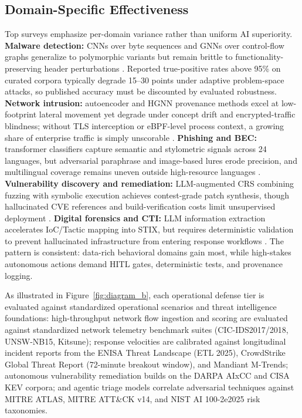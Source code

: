 \documentclass[conference,10pt,twocolumn,a4paper]{IEEEtran}
\begin{document}
\subsection{Domain-Specific Effectiveness}
Top surveys emphasize per-domain variance rather than uniform AI superiority. \textbf{Malware detection:} CNNs over byte sequences and GNNs over control-flow graphs generalize to polymorphic variants but remain brittle to functionality-preserving header perturbations \cite{carlini2017towards, mirsky2018kitsune}. Reported true-positive rates above 95\% on curated corpora typically degrade 15--30 points under adaptive problem-space attacks, so published accuracy must be discounted by evaluated robustness. \textbf{Network intrusion:} autoencoder and HGNN provenance methods excel at low-footprint lateral movement yet degrade under concept drift and encrypted-traffic blindness; without TLS interception or eBPF-level process context, a growing share of enterprise traffic is simply unscorable \cite{mirsky2018kitsune, jiang2024provenance}. \textbf{Phishing and BEC:} transformer classifiers capture semantic and stylometric signals across 24 languages, but adversarial paraphrase and image-based lures erode precision, and multilingual coverage remains uneven outside high-resource languages \cite{enisa_etl_2025}. \textbf{Vulnerability discovery and remediation:} LLM-augmented CRS combining fuzzing with symbolic execution achieves contest-grade patch synthesis, though hallucinated CVE references and build-verification costs limit unsupervised deployment \cite{darpa_aixcc_2025, fang2024llm, fang2024teams}. \textbf{Digital forensics and CTI:} LLM information extraction accelerates IoC/Tactic mapping into STIX, but requires deterministic validation to prevent hallucinated infrastructure from entering response workflows \cite{cisa_agentic_ai_2026}. The pattern is consistent: data-rich behavioral domains gain most, while high-stakes autonomous actions demand HITL gates, deterministic tests, and provenance logging.

As illustrated in Figure~\ref{fig:diagram_b}, each operational defense tier is evaluated against standardized operational scenarios and threat intelligence foundations: high-throughput network flow ingestion and scoring are evaluated against standardized network telemetry benchmark suites (CIC-IDS2017/2018, UNSW-NB15, Kitsune); response velocities are calibrated against longitudinal incident reports from the ENISA Threat Landscape (ETL 2025), CrowdStrike Global Threat Report (72-minute breakout window), and Mandiant M-Trends; autonomous vulnerability remediation builds on the DARPA AIxCC and CISA KEV corpora; and agentic triage models correlate adversarial techniques against MITRE ATLAS, MITRE ATT\&CK v14, and NIST AI 100-2e2025 risk taxonomies.
\end{document}
